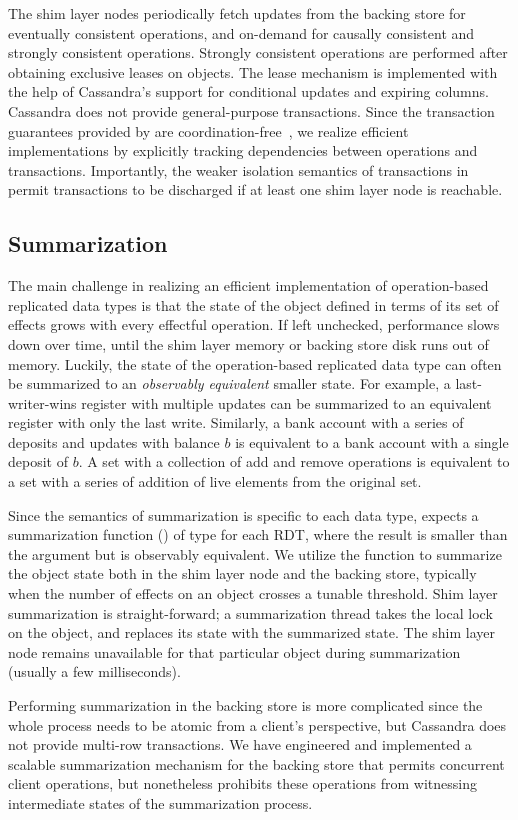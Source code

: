 The shim layer nodes periodically fetch updates from the backing store for
eventually consistent operations, and on-demand for causally consistent and
strongly consistent operations. Strongly consistent operations are performed
after obtaining exclusive leases on objects. The lease mechanism is
implemented with the help of Cassandra's support for conditional updates and
expiring columns. Cassandra does not provide general-purpose
transactions. Since the transaction guarantees provided by \name are
coordination-free~\cite{BailisHAT}, we realize efficient implementations by
explicitly tracking dependencies between operations and transactions.
Importantly, the weaker isolation semantics of transactions in \name permit
transactions to be discharged if at least one shim layer node is reachable.

\subsection{Summarization}

The main challenge in realizing an efficient implementation of operation-based
replicated data types is that the state of the object defined in terms of its
set of effects grows with every effectful operation. If left unchecked,
performance slows down over time, until the shim layer memory or backing store
disk runs out of memory. Luckily, the state of the operation-based replicated
data type can often be summarized to an \emph{observably equivalent} smaller
state. For example, a last-writer-wins register with multiple updates can be
summarized to an equivalent register with only the last write. Similarly, a
bank account with a series of deposits and updates with balance $b$ is
equivalent to a bank account with a single deposit of $b$. A set with a
collection of add and remove operations is equivalent to a set with a series of
addition of live elements from the original set.

Since the semantics of summarization is specific to each data type, \name
expects a summarization function () of type \cf{[e]->[e]} for
each RDT, where the result is smaller than the argument but is observably
equivalent. We utilize the  function to summarize the object
state both in the shim layer node and the backing store, typically when the
number of effects on an object crosses a tunable threshold. Shim layer
summarization is straight-forward; a summarization thread takes the local lock
on the object, and replaces its state with the summarized state. The shim layer
node remains unavailable for that particular object during summarization
(usually a few milliseconds).

Performing summarization in the backing store is more complicated since the
whole process needs to be atomic from a client's perspective, but Cassandra
does not provide multi-row transactions. We have engineered and implemented
a scalable summarization mechanism for the backing store that permits
concurrent client operations, but nonetheless prohibits these operations
from witnessing intermediate states of the summarization process.
